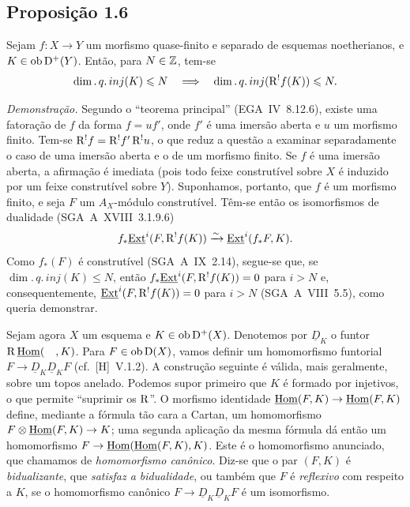 \subsection*{Proposição 1.6}
Sejam $f : X \to Y$ um morfismo quase-finito e separado de esquemas noetherianos, e $K \in \operatorname{ob} \mathrm{D}^{+}(Y)$. Então, para $N \in \mathbb{Z}$, tem-se
\[
\dim.\,q.\,inj(K) \leqslant N \quad \Longrightarrow \quad \dim.\,q.\,inj(\mathrm{R}^{!}f(K)) \leqslant N.
\]

\emph{Demonstração.} Segundo o ``teorema principal'' (EGA~IV~8.12.6), existe uma fatoração de $f$ da forma $f = uf'$, onde $f'$ é uma imersão aberta e $u$ um morfismo finito. Tem-se $\mathrm{R}^{!}f = \mathrm{R}^{!}f' \, \mathrm{R}^{!}u$, o que reduz a questão a examinar separadamente o caso de uma imersão aberta e o de um morfismo finito. Se $f$ é uma imersão aberta, a afirmação é imediata (pois todo feixe construtível sobre $X$ é induzido por um feixe construtível sobre $Y$). Suponhamos, portanto, que $f$ é um morfismo finito, e seja $F$ um $A_X$-módulo construtível. Têm-se então os isomorfismos de dualidade (SGA~A~XVIII~3.1.9.6)
\[
f_{*}\underline{\operatorname{Ext}}^i(F, \mathrm{R}^{!}f(K)) \xrightarrow{\sim} \underline{\operatorname{Ext}}^i(f_{*}F, K).
\]
Como $f_{*}(F)$ é construtível (SGA~A~IX~2.14), segue-se que, se $\dim.\,q.\,inj(K) \leqslant N$, então $f_{*}\underline{\operatorname{Ext}}^i(F, \mathrm{R}^{!}f(K)) = 0$ para $i > N$ e, consequentemente, $\underline{\operatorname{Ext}}^i(F, \mathrm{R}^{!}f(K)) = 0$ para $i > N$ (SGA~A~VIII~5.5), como queria demonstrar.

Sejam agora $X$ um esquema e $K \in \operatorname{ob} \mathrm{D}^{+}(X)$. Denotemos por $\underline{D}_K$ o funtor $\mathrm{R}\,\underline{\operatorname{Hom}}(\quad, K)$. Para $F \in \operatorname{ob} \mathrm{D}(X)$, vamos definir um homomorfismo funtorial $F \to \underline{D}_K \underline{D}_K F$ (cf.~[H]~V.1.2). A construção seguinte é válida, mais geralmente, sobre um topos anelado. Podemos supor primeiro que $K$ é formado por injetivos, o que permite ``suprimir os $\mathrm{R}$''. O morfismo identidade $\underline{\operatorname{Hom}}(F,K) \to \underline{\operatorname{Hom}}(F,K)$ define, mediante a fórmula tão cara a Cartan, um homomorfismo $F \otimes \underline{\operatorname{Hom}}(F,K) \to K$; uma segunda aplicação da mesma fórmula dá então um homomorfismo $F \to \underline{\operatorname{Hom}}(\underline{\operatorname{Hom}}(F,K), K)$. Este é o homomorfismo anunciado, que chamamos de \emph{homomorfismo canônico}. Diz-se que o par $(F,K)$ é \emph{bidualizante}, que \emph{satisfaz a bidualidade}, ou também que $F$ é \emph{reflexivo} com respeito a $K$, se o homomorfismo canônico $F \to \underline{D}_K \underline{D}_K F$ é um isomorfismo.

